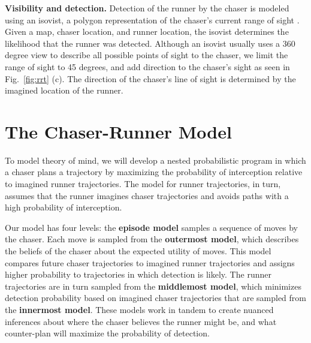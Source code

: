 \documentclass{article}
\begin{document}
\textbf{Visibility and detection.}  Detection of the runner by the
chaser is modeled using an isovist, a polygon
representation of the chaser's current range of sight
\cite{isovist79,morariu2007human}. Given a map, chaser location, and
runner location, the isovist determines the likelihood
that the runner was detected. Although an isovist usually uses a 360
degree view to describe all possible points of sight to the chaser, we
limit the range of sight to 45
degrees, and add direction to the chaser's sight as seen in
Fig.~\ref{fig:rrt} (c). The direction of the chaser's line of sight is determined by the imagined location of the runner.


\section{The Chaser-Runner Model}
\label{sec:tcrm}

To model theory of mind, we will develop a nested probabilistic program in which a chaser plans a trajectory by maximizing the probability of interception relative to imagined runner trajectories. The model for runner trajectories, in turn, assumes that the runner imagines chaser trajectories and avoids paths with a high probability of interception. 

Our model has four levels: the \textbf{episode model} samples a sequence of moves by the chaser. Each move is sampled from the \textbf{outermost model}, which describes the
beliefs of the chaser about the expected utility of moves. This model compares future chaser trajectories to imagined runner trajectories and assigns higher probability to trajectories in which detection  is likely. The runner trajectories are in turn sampled from the  \textbf{middlemost model}, which minimizes detection probability based on imagined chaser trajectories that are sampled from the \textbf{innermost model}.
%
These models work in tandem to create nuanced inferences about
where the chaser believes the runner might be, and what 
counter-plan will maximize the probability of detection.
\end{document}
